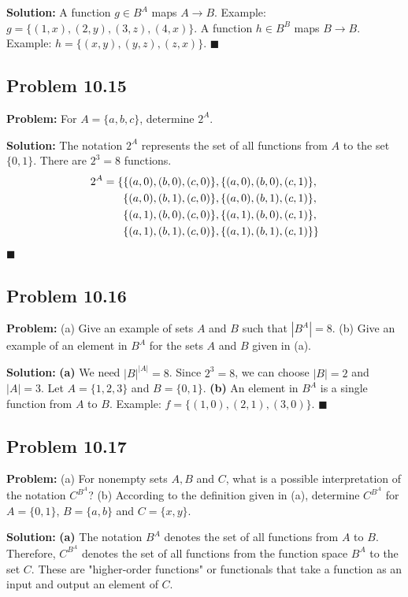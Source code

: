 \documentclass[11pt, a4paper]{article}
\theoremstyle{definition}
\theoremstyle{remark}
\begin{document}
\textbf{Solution:}
A function $g \in B^A$ maps $A \to B$. Example: $g = \{(1, x), (2, y), (3, z), (4, x)\}$.
A function $h \in B^B$ maps $B \to B$. Example: $h = \{(x, y), (y, z), (z, x)\}$.
$\blacksquare$

\subsection{Problem 10.15}
\textbf{Problem:} For $A = \{a, b, c\}$, determine $2^A$.

\textbf{Solution:}
The notation $2^A$ represents the set of all functions from $A$ to the set $\{0, 1\}$. There are $2^3 = 8$ functions.
\begin{align*}
    2^A = \{ &\{(a,0), (b,0), (c,0)\}, \{(a,0), (b,0), (c,1)\}, \\ \relax
    &\{(a,0), (b,1), (c,0)\}, \{(a,0), (b,1), (c,1)\}, \\ \relax
    &\{(a,1), (b,0), (c,0)\}, \{(a,1), (b,0), (c,1)\}, \\ \relax
    &\{(a,1), (b,1), (c,0)\}, \{(a,1), (b,1), (c,1)\} \}
\end{align*}
$\blacksquare$

\subsection{Problem 10.16}
\textbf{Problem:} (a) Give an example of sets $A$ and $B$ such that $|B^A| = 8$. (b) Give an example of an element in $B^A$ for the sets $A$ and $B$ given in (a).

\textbf{Solution:}
\textbf{(a)} We need $|B|^{|A|} = 8$. Since $2^3 = 8$, we can choose $|B| = 2$ and $|A| = 3$. Let $A = \{1, 2, 3\}$ and $B = \{0, 1\}$.
\textbf{(b)} An element in $B^A$ is a single function from $A$ to $B$. Example: $f = \{(1, 0), (2, 1), (3, 0)\}$.
$\blacksquare$

\subsection{Problem 10.17}
\textbf{Problem:} (a) For nonempty sets $A, B$ and $C$, what is a possible interpretation of the notation $C^{B^A}$? (b) According to the definition given in (a), determine $C^{B^A}$ for $A = \{0, 1\}$, $B = \{a, b\}$ and $C = \{x, y\}$.

\textbf{Solution:}
\textbf{(a)} The notation $B^A$ denotes the set of all functions from $A$ to $B$. Therefore, $C^{B^A}$ denotes the set of all functions from the function space $B^A$ to the set $C$. These are "higher-order functions" or functionals that take a function as an input and output an element of $C$.
\end{document}
